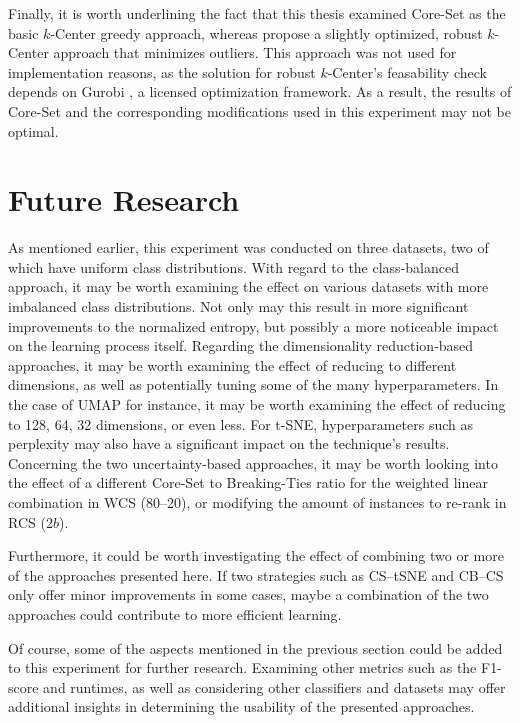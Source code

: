 \documentclass[english,bachelor,ul]{webisthesis} %
\begin{document}
Finally, it is worth underlining the fact that this thesis examined Core-Set as the basic $k$-Center greedy approach, whereas \cite{DBLP:conf/iclr/SenerS18} propose a slightly optimized, robust $k$-Center approach that minimizes outliers. This approach was not used for implementation reasons, as the solution for robust $k$-Center's feasability check depends on Gurobi \citep{gurobi}, a licensed optimization framework. As a result, the results of Core-Set and the corresponding modifications used in this experiment may not be optimal.

\section{Future Research}

As mentioned earlier, this experiment was conducted on three datasets, two of which have uniform class distributions. With regard to the class-balanced approach, it may be worth examining the effect on various datasets with more imbalanced class distributions. Not only may this result in more significant improvements to the normalized entropy, but possibly a more noticeable impact on the learning process itself. Regarding the dimensionality reduction-based approaches, it may be worth examining the effect of reducing to different dimensions, as well as potentially tuning some of the many hyperparameters. In the case of UMAP for instance, it may be worth examining the effect of reducing to 128, 64, 32 dimensions, or even less. For t-SNE, hyperparameters such as perplexity may also have a significant impact on the technique's results. Concerning the two uncertainty-based approaches, it may be worth looking into the effect of a different Core-Set to Breaking-Ties ratio for the weighted linear combination in WCS (80--20), or modifying the amount of instances to re-rank in RCS ($2b$). 

Furthermore, it could be worth investigating the effect of combining two or more of the approaches presented here. If two strategies such as CS--tSNE and CB--CS only offer minor improvements in some cases, maybe a combination of the two approaches could contribute to more efficient learning.

Of course, some of the aspects mentioned in the previous section could be added to this experiment for further research. Examining other metrics such as the F1-score and runtimes, as well as considering other classifiers and datasets may offer additional insights in determining the usability of the presented approaches. 
\end{document}
